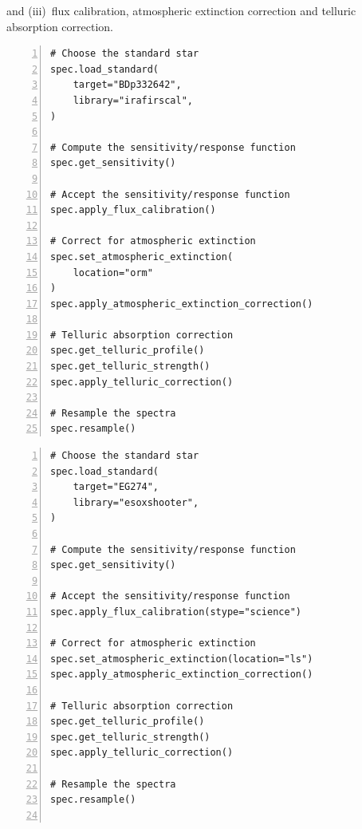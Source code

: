 \documentclass[linenumbers, twocolumn]{aastex631}
\begin{document}
and (iii)~flux calibration, atmospheric extinction correction and telluric absorption correction.

\vspace*{1em}

\noindent
\begin{minipage}{0.475\linewidth}
\begin{Verbatim}[frame=topline,numbers=left,label=LT/SPRAT,framesep=3mm]
# Choose the standard star
spec.load_standard(
    target="BDp332642",
    library="irafirscal",
)

# Compute the sensitivity/response function
spec.get_sensitivity()

# Accept the sensitivity/response function
spec.apply_flux_calibration()

# Correct for atmospheric extinction
spec.set_atmospheric_extinction(
    location="orm"
)
spec.apply_atmospheric_extinction_correction()

# Telluric absorption correction
spec.get_telluric_profile()
spec.get_telluric_strength()
spec.apply_telluric_correction()

# Resample the spectra
spec.resample()
\end{Verbatim}
\end{minipage}\hfill
\begin{minipage}{0.475\linewidth}
\begin{Verbatim}[frame=topline,numbers=left,label=Gemini/GMOS,framesep=3mm]
# Choose the standard star
spec.load_standard(
    target="EG274",
    library="esoxshooter",
)

# Compute the sensitivity/response function
spec.get_sensitivity()

# Accept the sensitivity/response function
spec.apply_flux_calibration(stype="science")

# Correct for atmospheric extinction
spec.set_atmospheric_extinction(location="ls")
spec.apply_atmospheric_extinction_correction()

# Telluric absorption correction
spec.get_telluric_profile()
spec.get_telluric_strength()
spec.apply_telluric_correction()

# Resample the spectra
spec.resample()


\end{Verbatim}
\end{minipage}



{}



\end{document}
